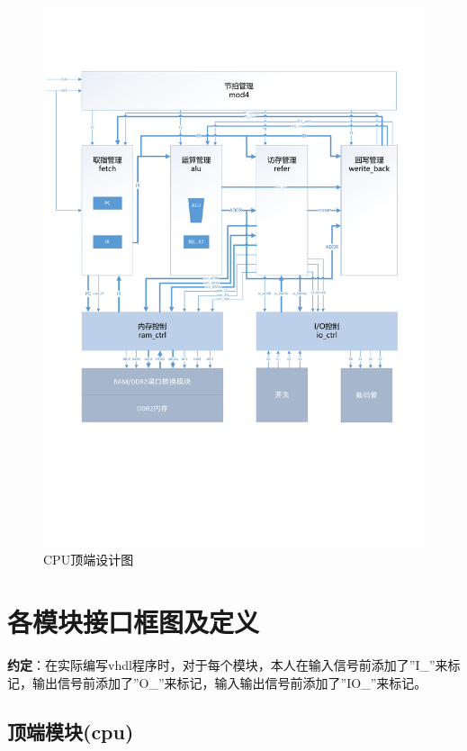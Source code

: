 \documentclass[forprint]{WHUBachelor}
\begin{document}
\begin{figure}
  \centering
  \includegraphics[width=7.6in]{figures/cpu_top.pdf}
  \caption{CPU顶端设计图}
  \label{fig:cpu_top}
\end{figure}
\thispagestyle{empty}
\restoregeometry

\chapter{各模块接口框图及定义}

{\bf 约定}：在实际编写vhdl程序时，对于每个模块，本人在输入信号前添加了''I\_''来标记，输出信号前添加了''O\_''来标记，输入输出信号前添加了''IO\_''来标记。

\section{顶端模块(cpu)}
\end{document}
